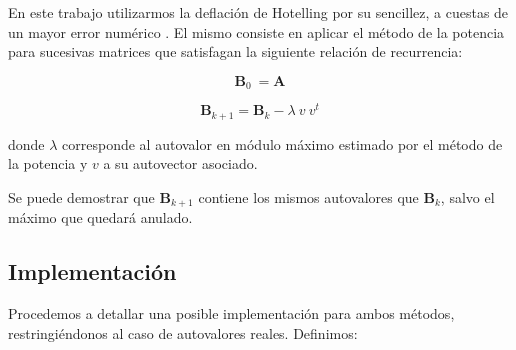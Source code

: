 \vspace{1em}
En este trabajo utilizarmos la deflación de Hotelling por su sencillez, a cuestas de un mayor error numérico \cite{Burden}. El mismo consiste en aplicar el método de la potencia para sucesivas matrices que satisfagan la siguiente relación de recurrencia:

\vspace{1em}
\begin{equation*}
    \mathbf{B}_0\ = \mathbf{A}
\end{equation*}

\begin{equation} \label{deflacion}
    \mathbf{B}_{k+1} = \mathbf{B}_{k} - \lambda\ v\ v^t 
\end{equation}

\vspace{1em}
\noindent donde $\lambda$ corresponde al autovalor en módulo máximo estimado por el método de la potencia y $v$ a su autovector asociado.

\vspace{1em}
Se puede demostrar  que $\mathbf{B}_{k+1}$ contiene los mismos autovalores que $\mathbf{B}_{k}$, salvo el máximo que quedará anulado. %









\vspace{2em}
\subsection{Implementación} Procedemos a detallar una posible implementación para ambos métodos, restringiéndonos al caso de autovalores reales. Definimos:

